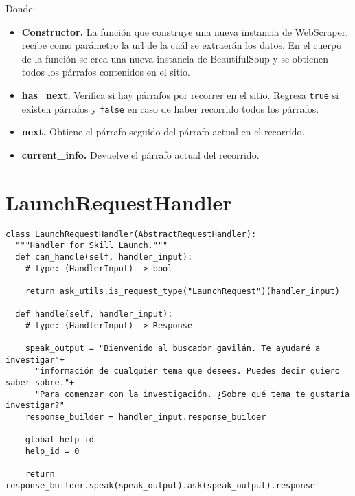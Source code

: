 Donde:

\begin{itemize}
  \item \textbf{Constructor.} La función que construye una nueva instancia de WebScraper, recibe como parámetro la url de la cuál se extraerán los datos. En el cuerpo de la función se crea una nueva instancia de BeautifulSoup y se obtienen todos los párrafos contenidos en el sitio.
  \item \textbf{has\_next.} Verifica si hay párrafos por recorrer en el sitio. Regresa \texttt{true} si existen párrafos y \texttt{false} en caso de haber recorrido todos los párrafos.
  \item \textbf{next.} Obtiene el párrafo seguido del párrafo actual en el recorrido.
  \item \textbf{current\_info.} Devuelve el párrafo actual del recorrido.
\end{itemize}


\section{LaunchRequestHandler}
\label{A2Anexo}

\begin{tcolorbox}[colback=white!25!white,colframe=blue]
  \begin{verbatim}
class LaunchRequestHandler(AbstractRequestHandler):
  """Handler for Skill Launch."""
  def can_handle(self, handler_input):
    # type: (HandlerInput) -> bool

    return ask_utils.is_request_type("LaunchRequest")(handler_input)

  def handle(self, handler_input):
    # type: (HandlerInput) -> Response
        
    speak_output = "Bienvenido al buscador gavilán. Te ayudaré a investigar"+ 
      "información de cualquier tema que desees. Puedes decir quiero saber sobre."+
      "Para comenzar con la investigación. ¿Sobre qué tema te gustaría investigar?"
    response_builder = handler_input.response_builder
        
    global help_id
    help_id = 0

    return response_builder.speak(speak_output).ask(speak_output).response
  \end{verbatim}
\end{tcolorbox}

